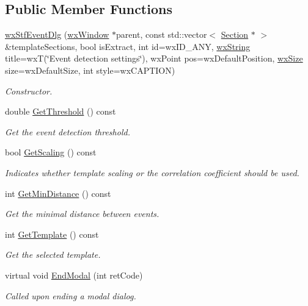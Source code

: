 \subsection*{Public Member Functions}
\begin{DoxyCompactItemize}
\item 
\hyperlink{classwxStfEventDlg_a9a2b621347c3b7023925bf34fbc6aec8}{wxStfEventDlg} (\hyperlink{classwxWindow}{wxWindow} $\ast$parent, const std::vector$<$ \hyperlink{classSection}{Section} $\ast$ $>$ \&templateSections, bool isExtract, int id=wxID\_\-ANY, \hyperlink{classwxString}{wxString} title=wxT(\char`\"{}Event detection settings\char`\"{}), wxPoint pos=wxDefaultPosition, \hyperlink{classwxSize}{wxSize} size=wxDefaultSize, int style=wxCAPTION)
\begin{DoxyCompactList}\small\item\em Constructor. \item\end{DoxyCompactList}\item 
double \hyperlink{classwxStfEventDlg_a9d8b27333f9876691d79d0e30a1458ee}{GetThreshold} () const 
\begin{DoxyCompactList}\small\item\em Get the event detection threshold. \item\end{DoxyCompactList}\item 
bool \hyperlink{classwxStfEventDlg_a42308a83a05ad311035411807618cdcf}{GetScaling} () const 
\begin{DoxyCompactList}\small\item\em Indicates whether template scaling or the correlation coefficient should be used. \item\end{DoxyCompactList}\item 
int \hyperlink{classwxStfEventDlg_a8c1e61f0d00bebd250cc84995994f3e4}{GetMinDistance} () const 
\begin{DoxyCompactList}\small\item\em Get the minimal distance between events. \item\end{DoxyCompactList}\item 
int \hyperlink{classwxStfEventDlg_a93043c17a21791ecc9d59d28d06f76f6}{GetTemplate} () const 
\begin{DoxyCompactList}\small\item\em Get the selected template. \item\end{DoxyCompactList}\item 
virtual void \hyperlink{classwxStfEventDlg_a986b0e424be3432d17c20e7507e03519}{EndModal} (int retCode)
\begin{DoxyCompactList}\small\item\em Called upon ending a modal dialog. \item\end{DoxyCompactList}\end{DoxyCompactItemize}


